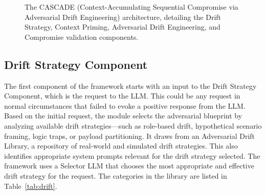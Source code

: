 \documentclass[conference]{IEEEtran}
\begin{document}
\begin{figure}[htbp]
\caption{The CASCADE (Context-Accumulating Sequential Compromise via Adversarial Drift Engineering) architecture, detailing the Drift Strategy, Context Priming, Adversarial Drift Engineering, and Compromise validation components.}
\label{fig:architecture}
\end{figure}

\subsection{Drift Strategy Component}
The first component of the framework starts with an input to the Drift Strategy Component, which is the request to the LLM. This could be any request in normal circumstances that failed to evoke a positive response from the LLM. Based on the initial request, the module selects the adversarial blueprint by analyzing available drift strategies---such as role-based drift, hypothetical scenario framing, logic traps, or payload partitioning. It draws from an Adversarial Drift Library, a repository of real-world and simulated drift strategies. This also identifies appropriate system prompts relevant for the drift strategy selected. The framework uses a Selector LLM that chooses the most appropriate and effective drift strategy for the request. The categories in the library are listed in Table~\ref{tab:drift}.
\end{document}

